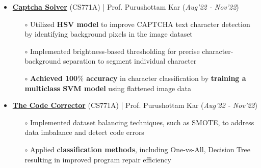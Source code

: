 \documentclass[10.8pt, a4paper]{extarticle}
\begin{document}
\begin{itemize}
  \item \href{https://github.com/Vinay-Agrawal29/Captcha-Solver-CS771} {\textbf{Captcha Solver}} (CS771A) | Prof. Purushottam Kar  \hfill\hfill(\textit{Aug'22 - Nov'22})
  \begin{itemize}
    \item[$\circ$] Utilized \textbf{HSV model} to improve CAPTCHA text character detection by identifying background pixels in the image dataset \\[-0.6cm]
    \item[$\circ$] Implemented brightness-based thresholding for precise character-background separation to segment individual character\\[-0.6cm]
    \item[$\circ$] \textbf{Achieved 100$\%$ accuracy} in character classification by \textbf{training a multiclass SVM model} using flattened image data\\[-0.6cm]
  \end{itemize}
  \vspace{0.055cm}
  \item \href{https://github.com/vamshimorlawar/CS771A/tree/main/Assignment_2/} {\textbf{The Code Corrector}} (CS771A) | Prof. Purushottam Kar  \hfill\hfill(\textit{Aug'22 - Nov'22})
  \begin{itemize}
    \item[$\circ$] Implemented dataset balancing techniques, such as SMOTE, to address data imbalance and detect code errors \\[-0.6cm]
    \item[$\circ$] Applied \textbf{classification methods}, including One-vs-All, Decision Tree resulting in improved program repair efficiency \\[-0.6cm]
  \end{itemize}
  \vspace{0.055cm}

\end{itemize}
\end{document}
